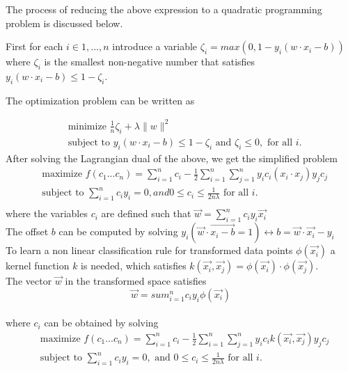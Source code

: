 \documentclass{kththesis}
\begin{document}
The process of reducing the above expression to a quadratic programming problem is discussed below.

First for each $i \in {1,...,n}$ introduce a variable $\zeta_{i}=max(0,1-y_{i}(w \cdot x_{i}-b))$ where $\zeta_{i}$ is the smallest non-negative number that satisfies $y_{i}(w\cdot x_{i}-b) \leq 1 - \zeta_{i}$.

The optimization problem can be written as

\begin{align*}
&\text{minimize } \frac{1}{n}\zeta_{i} + \lambda \parallel w \parallel^{2} \\
&\text{subject to } y_{i}(w \cdot x_{i}-b) \leq 1 - \zeta_{i} \text{ and } \zeta_{i} \leq 0, \text{ for all } i.
\end{align*}
After solving the Lagrangian dual of the above, we get the simplified problem
\begin{align*}
&\text{maximize }f(c_{1}...c_{n})=\sum^{n}_{i=1}c_{i} - \frac{1}{2} \sum^{n}_{i=1} \sum^{n}_{j=1}y_{i}c_{i}(x_{i}\cdot x_{j})y_{j}c_{j} \\
&\text{subject to }\sum^{n}_{i=1}c_{i}y_{i}=0, and 0 \leq c_{i} \leq \frac{1}{2n\lambda} \text{ for all } i. \\
\end{align*}
where the variables $c_{i}$ are defined such that $\vec{w} = \sum^{n}_{i=1}c_{i}y_{i}\vec{x_{i}}$ \\
The offset $b$ can be computed by solving $y_{i}(\vec{w} \cdot \vec{x_{i} - b} = 1)\longleftrightarrow b = \vec{w} \cdot \vec{x_{i}}-y_{i}$\\
To learn a non linear classification rule for transformed data points $\phi(\vec{x_{i}})$ a kernel function $k$ is needed, which satisfies $k(\vec{x_{i}}, \vec{x_{j}}) = \phi(\vec{x_{i}}) \cdot \phi(\vec{x_{j}})$.\\
The vector $\vec{w}$ in the transformed space satisfies
\begin{equation}
\vec{w} = sum^{n}_{i=1}c_{i}y_{i}\phi(\vec{x_{i}})
\end{equation}
\\
where $c_{i}$ can be obtained by solving
\begin{align*}
&\text{maximize }f(c_{1}...c_{n}) = \sum^{n}_{i=1}c_{i}-\frac{1}{2}\sum^{n}_{i=1} \sum^{n}_{j=1}y_{i}c_{i}k(\vec{x_{i}}, \vec{x_{j}})y_{j}c_{j} \\
&\text{subject to }\sum^{n}_{i=1}c_{i}y_{i} = 0, \text{ and } 0 \leq c_{i} \leq \frac{1}{2n\lambda} \text{ for all } i.
\end{align*}
\end{document}
